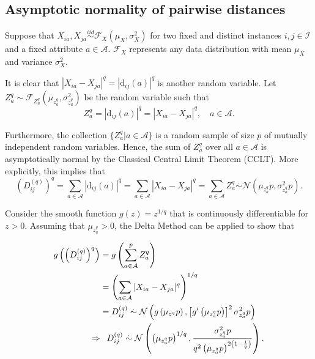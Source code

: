 \documentclass[10pt,letterpaper]{article}
\begin{document}
\subsection{Asymptotic normality of pairwise distances}

Suppose that $X_{ia}, X_{ja} \overset{iid}{\sim} \mathcal{F}_X\left(\mu_X,\sigma^2_X\right)$ for two fixed and distinct instances $i,j \in \mathcal{I}$ and a fixed attribute $a \in \mathcal{A}$.
$\mathcal{F}_X$ represents any data distribution with mean $\mu_X$ and variance $\sigma^2_X$.

It is clear that $|X_{ia} - X_{ja}|^q = |\text{d}_{ij}(a)|^q$ is another random variable. Let $Z^q_a \sim \mathcal{F}_{Z^q_a}\left(\mu_{z^q_a},\sigma^2_{z^q_a}\right)$ be the random variable such that
%
\begin{equation}\label{eq:diffDistr}
Z^q_a = |\text{d}_{ij}(a)|^q = |X_{ia} - X_{ja}|^q, \quad a \in \mathcal{A}.
\end{equation}

Furthermore, the collection $\{Z^q_a | a \in \mathcal{A}\}$ is a random sample of size $p$ of mutually independent random variables. Hence, the sum of $Z^q_a$ over all $a \in \mathcal{A}$ is asymptotically normal by the Classical Central Limit Theorem (CCLT). More explicitly, this implies that
%
\begin{equation}\label{eq:DqAsympt}
\left(D^{(q)}_{ij}\right)^q = \sum_{a \in \mathcal{A}} |\text{d}_{ij}(a)|^q = \sum_{a \in \mathcal{A}} |X_{ia} - X_{ja}|^q = \sum_{a \in \mathcal{A}} Z^q_a \overset{.}{\sim} \mathcal{N}\left(\mu_{z^q_a}p,\sigma^2_{z^q_a}p\right).
\end{equation}

Consider the smooth function $g(z) = z^{1/q}$ that is continuously differentiable for $z>0$. Assuming that $\mu_{z^q_a}>0$, the Delta Method \cite{allStats} can be applied to show that 

\begin{equation}\label{eq:DqDeltaMethod}
\begin{aligned}
g\left(\left(D^{(q)}_{ij}\right)^q\right) &= g\left(\displaystyle \sum_{a \in \mathcal{A}}^{p}Z^q_a\right) \\
&= \left(\sum_{a \in \mathcal{A}} |X_{ia} - X_{ja}|^q\right)^{1/q} \\
&= D^{(q)}_{ij} \overset{.}{\sim} \mathcal{N}\left(g\left(\mu_{z^q}p\right),\left[g^\prime \left(\mu_{z^q_a}p\right)\right]^2\sigma^2_{z^q_a}p\right) \\
\Rightarrow &\hphantom{=} D^{(q)}_{ij} \overset{.}{\sim} \mathcal{N}\left(\left(\mu_{z^q_a}p\right)^{1/q},\frac{\sigma^2_{z^q_a}p}{q^2\left(\mu_{z^q_a}p\right)^{2\left(1 - \frac{1}{q}\right)}}\right).
\end{aligned}
\end{equation}
\end{document}
